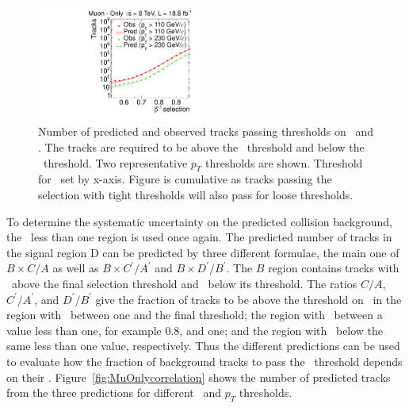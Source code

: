 \begin{figure}
\centering
  \includegraphics[clip=false, trim=0.0cm 0cm 0.0cm 0cm, width=0.48\textwidth]{figures/muonly/Prediction_Data8TeV_NPredVsNObs_Flip}
  \caption[Number of predicted and observed tracks in the \invbeta\ $<$ 1 region in the \muononly\ analysis]
{Number of predicted and observed tracks passing thresholds on \pt\ and \invbeta. The tracks are required to be above the \pt\ threshold and below the \invbeta\ threshold.
Two representative $p_T$ thresholds are shown. Threshold for \invbeta\ set by x-axis.
Figure is cumulative as tracks passing the selection with tight thresholds will also pass for loose thresholds.}
    \label{fig:PredFlipPt230}
\end{figure}

To determine the systematic uncertainty on the predicted collision background, the \invbeta\ less than one region is used once again. The predicted number of tracks
in the signal region D can be predicted by three different formulae, the main one of $B \times C/A$ as well as 
$B \times C^{\prime}/A^{\prime}$ and $B \times D^{\prime}/B^{\prime}$. The $B$ region contains tracks with \invbeta\ above the final selection threshold and
\pt\ below its threshold. The ratios $C/A$, $C^{\prime}/A^{\prime}$, and $D^{\prime}/B^{\prime}$ give the fraction of tracks to be above the threshold on \pt\
in the region with \invbeta\ between one and the final threshold; the region with \invbeta\ between a value less than one, for example 0.8, and one;
and the region with \invbeta\ below
the same less than one value, respectively. Thus the different predictions can be used to evaluate how the fraction of background tracks to pass the \pt\ threshold depends on
their \invbeta.
Figure~\ref{fig:MuOnlycorrelation} shows the number of predicted tracks from the three predictions for different \invbeta\ and $p_T$ thresholds.

